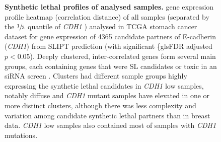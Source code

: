 \begin{figure}[!ht]
  \centering
    \caption[Synthetic lethal  profiles of stomach samples]{\small \textbf{Synthetic lethal  profiles of analysed samples.} \Gls{gene expression} profile heatmap (correlation distance) of all samples (separated by the $\sfrac{1}{3}$ quantile of \textit{CDH1} ) analysed in \gls{TCGA} stomach cancer dataset for \gls{gene expression} of 4365 candidate partners of \gls{E-cadherin} (\textit{CDH1}) from \gls{SLIPT} prediction (with significant \{gls{FDR} adjusted $p < 0.05$). Deeply clustered, inter-correlated genes form several main groups, each containing genes that were SL candidates or toxic in an \gls{siRNA} screen \cite{Telford2015}. Clusters had different sample groups highly expressing the \gls{synthetic lethal} candidates in \textit{CDH1} low samples, notably diffuse and \textit{CDH1} \gls{mutant} samples have elevated  in one or more distinct clusters, although there was less complexity and variation among candidate \gls{synthetic lethal} partners than in breast data. \textit{CDH1} low samples also contained most of samples with \textit{CDH1} \glspl{mutation}.
}
\label{fig:slipt_expr_stad}
\end{figure}

